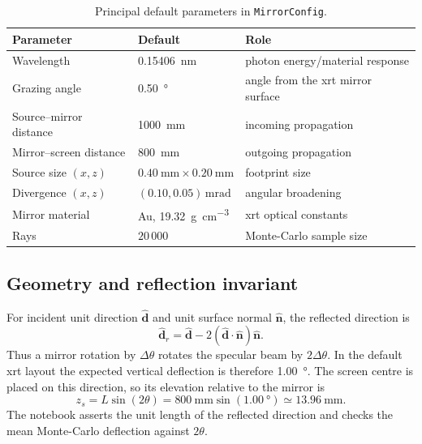 \documentclass[11pt,a4paper]{article}
\begin{document}
\begin{table}[H]
\centering
\caption{Principal default parameters in \texttt{MirrorConfig}.}
\begin{tabular}{@{}lll@{}}
\toprule
Parameter & Default & Role \\
\midrule
Wavelength & \SI{0.15406}{\nano\metre} & photon energy/material response \\
Grazing angle & \SI{0.50}{\degree} & angle from the xrt mirror surface \\
Source--mirror distance & \SI{1000}{\milli\metre} & incoming propagation \\
Mirror--screen distance & \SI{800}{\milli\metre} & outgoing propagation \\
Source size $(x,z)$ & $\SI{0.40}{\milli\metre}\times\SI{0.20}{\milli\metre}$ & footprint size \\
Divergence $(x,z)$ & $(0.10,0.05)\,\si{\milli\radian}$ & angular broadening \\
Mirror material & Au, \SI{19.32}{\gram\per\cubic\centi\metre} & xrt optical constants \\
Rays & $20\,000$ & Monte-Carlo sample size \\
\bottomrule
\end{tabular}
\end{table}

\subsection{Geometry and reflection invariant}

For incident unit direction $\hat{\mathbf d}$ and unit surface normal
$\hat{\mathbf n}$, the reflected direction is
\begin{equation}
 \hat{\mathbf d}_{r}=\hat{\mathbf d}
 -2(\hat{\mathbf d}\cdot\hat{\mathbf n})\hat{\mathbf n}.
 \label{eq:reflection}
\end{equation}
Thus a mirror rotation by $\Delta\theta$ rotates the specular beam by
$2\Delta\theta$.  In the default xrt layout the expected vertical deflection
is therefore \SI{1.00}{\degree}.  The screen centre is placed on this direction,
so its elevation relative to the mirror is
\begin{equation}
 z_s=L\sin(2\theta)
 =\SI{800}{\milli\metre}\sin(\SI{1.00}{\degree})
 \simeq\SI{13.96}{\milli\metre}.
\end{equation}
The notebook asserts the unit length of the reflected direction and checks the
mean Monte-Carlo deflection against $2\theta$.
\end{document}
